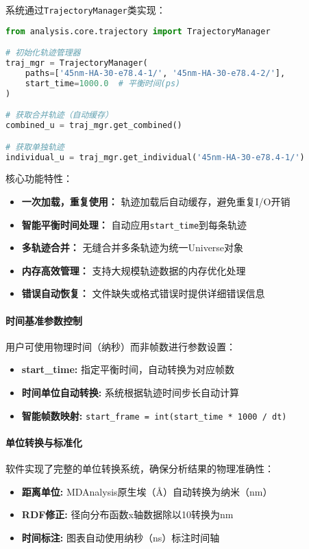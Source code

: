 系统通过\lstinline|TrajectoryManager|类实现：

\begin{lstlisting}[language=python,style=blockstyle]
from analysis.core.trajectory import TrajectoryManager

# 初始化轨迹管理器
traj_mgr = TrajectoryManager(
    paths=['45nm-HA-30-e78.4-1/', '45nm-HA-30-e78.4-2/'],
    start_time=1000.0  # 平衡时间(ps)
)

# 获取合并轨迹（自动缓存）
combined_u = traj_mgr.get_combined()

# 获取单独轨迹
individual_u = traj_mgr.get_individual('45nm-HA-30-e78.4-1/')
\end{lstlisting}

核心功能特性：
\begin{itemize}
    \item \textbf{一次加载，重复使用：} 轨迹加载后自动缓存，避免重复I/O开销
    \item \textbf{智能平衡时间处理：} 自动应用\lstinline|start_time|到每条轨迹
    \item \textbf{多轨迹合并：} 无缝合并多条轨迹为统一Universe对象
    \item \textbf{内存高效管理：} 支持大规模轨迹数据的内存优化处理
    \item \textbf{错误自动恢复：} 文件缺失或格式错误时提供详细错误信息
\end{itemize}

\paragraph{时间基准参数控制}

用户可使用物理时间（纳秒）而非帧数进行参数设置：
\begin{itemize}
    \item \textbf{start\_time:} 指定平衡时间，自动转换为对应帧数
    \item \textbf{时间单位自动转换:} 系统根据轨迹时间步长自动计算
    \item \textbf{智能帧数映射:} \lstinline|start_frame = int(start_time * 1000 / dt)|
\end{itemize}

\paragraph{单位转换与标准化}

软件实现了完整的单位转换系统，确保分析结果的物理准确性：
\begin{itemize}
    \item \textbf{距离单位:} MDAnalysis原生埃（Å）自动转换为纳米（nm）
    \item \textbf{RDF修正:} 径向分布函数x轴数据除以10转换为nm
    \item \textbf{时间标注:} 图表自动使用纳秒（ns）标注时间轴
\end{itemize}

